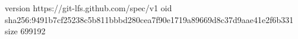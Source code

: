version https://git-lfs.github.com/spec/v1
oid sha256:9491b7cf25238c5b811bbbd280cea7f90e1719a89669d8c37d9aae41e2f6b331
size 699192
